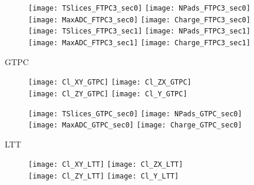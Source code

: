 \documentclass[11pt]{beamer}
\begin{document}
\begin{frame}{}
\begin{figure}
\centering
\texttt{[image: TSlices\_FTPC3\_sec0]}
\texttt{[image: NPads\_FTPC3\_sec0]}
\texttt{[image: MaxADC\_FTPC3\_sec0]}
\texttt{[image: Charge\_FTPC3\_sec0]} \\
\texttt{[image: TSlices\_FTPC3\_sec1]}
\texttt{[image: NPads\_FTPC3\_sec1]}
\texttt{[image: MaxADC\_FTPC3\_sec1]}
\texttt{[image: Charge\_FTPC3\_sec1]}
\end{figure}
\end{frame}

\begin{frame}
\centering
\Huge
GTPC
\end{frame}

\begin{frame}{}
\begin{figure}
\centering
\texttt{[image: Cl\_XY\_GTPC]}
\texttt{[image: Cl\_ZX\_GTPC]}\\
\texttt{[image: Cl\_ZY\_GTPC]}
\texttt{[image: Cl\_Y\_GTPC]}
\end{figure}
\end{frame}

\begin{frame}{}
\begin{figure}
\centering
\texttt{[image: TSlices\_GTPC\_sec0]}
\texttt{[image: NPads\_GTPC\_sec0]}\\
\texttt{[image: MaxADC\_GTPC\_sec0]}
\texttt{[image: Charge\_GTPC\_sec0]}
\end{figure}
\end{frame}

\begin{frame}
\centering
\Huge
LTT
\end{frame}

\begin{frame}{}
\begin{figure}
\centering
\texttt{[image: Cl\_XY\_LTT]}
\texttt{[image: Cl\_ZX\_LTT]}\\
\texttt{[image: Cl\_ZY\_LTT]}
\texttt{[image: Cl\_Y\_LTT]}
\end{figure}
\end{frame}
\end{document}
